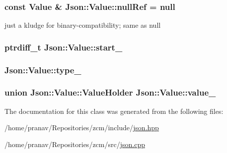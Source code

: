 \subsubsection[{\texorpdfstring{null\+Ref}{nullRef}}]{\setlength{\rightskip}{0pt plus 5cm}const {\bf Value} \& Json\+::\+Value\+::null\+Ref = {\bf null}\hspace{0.3cm}{\ttfamily [static]}}\hypertarget{classJson_1_1Value_aaa4ffd4e53967170c3e8c9abf682b5cd}{}\label{classJson_1_1Value_aaa4ffd4e53967170c3e8c9abf682b5cd}


just a kludge for binary-\/compatibility; same as null 

\subsubsection[{\texorpdfstring{start\+\_\+}{start_}}]{\setlength{\rightskip}{0pt plus 5cm}ptrdiff\+\_\+t Json\+::\+Value\+::start\+\_\+\hspace{0.3cm}{\ttfamily [private]}}\hypertarget{classJson_1_1Value_a1c3aeb0fa8fefe93776cb347c76a25a8}{}\label{classJson_1_1Value_a1c3aeb0fa8fefe93776cb347c76a25a8}
\subsubsection[{\texorpdfstring{type\+\_\+}{type_}}]{ Json\+::\+Value\+::type\+\_\+\hspace{0.3cm}{\ttfamily [private]}}\hypertarget{classJson_1_1Value_abd222c2536dc88bf330dedcd076d2356}{}\label{classJson_1_1Value_abd222c2536dc88bf330dedcd076d2356}
\subsubsection[{\texorpdfstring{value\+\_\+}{value_}}]{\setlength{\rightskip}{0pt plus 5cm}union {\bf Json\+::\+Value\+::\+Value\+Holder}  Json\+::\+Value\+::value\+\_\+\hspace{0.3cm}{\ttfamily [private]}}\hypertarget{classJson_1_1Value_aef578244546212705b9f81eb84d7e151}{}\label{classJson_1_1Value_aef578244546212705b9f81eb84d7e151}


The documentation for this class was generated from the following files\+:\begin{DoxyCompactItemize}
\item 
/home/pranav/\+Repositories/zcm/include/\hyperlink{json_8hpp}{json.\+hpp}\item 
/home/pranav/\+Repositories/zcm/src/\hyperlink{json_8cpp}{json.\+cpp}\end{DoxyCompactItemize}
